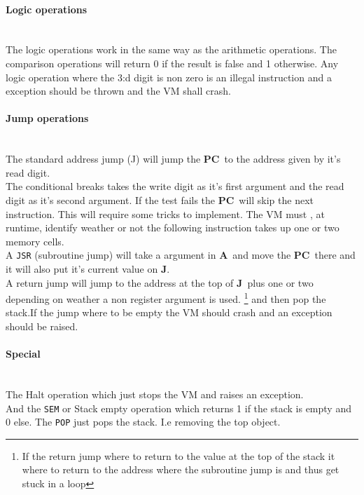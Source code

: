 \documentclass{article}
\newcommand{\V}{\verb}
\newcommand{\A}{$\textbf{A}$}
\newcommand{\pc}{$\textbf{PC}$}
\newcommand{\J}{$\textbf{J}$}
\begin{document}
\paragraph{Logic operations} \
\\
The logic operations work in the same way as the arithmetic operations. The
comparison operations will return 0 if the result is false and 1 otherwise.
Any logic operation where the 3:d digit is non zero is an illegal instruction
and a exception should be thrown and the VM shall crash.

\paragraph{Jump operations} \
\\
The standard address jump (J) will jump the \pc \ to the address given by it's
read digit.\\
The conditional breaks takes the write digit as it's first argument and the read
digit as it's second argument. If the test fails the \pc \ will skip the next
instruction. This will require some tricks to implement. The VM must , at
runtime, identify weather or not the following instruction takes up one or two
memory cells.\\

A \V+JSR+ (subroutine jump) will take a argument in \A \ and move the \pc \
there and it will also put it's current value on \J.\\
A return jump will jump to the address at the top of \J \ plus one or two
depending on weather a non register argument is used.
 \footnote{If the return jump where to return to the value at the top of the
 stack it where to return to the address where the subroutine jump is and thus
 get stuck in a loop} and then pop the stack.If the jump where to be empty the
 VM should crash and an exception should be raised.\\


\paragraph{Special}\
\\
The Halt operation which just stops the VM and
raises an exception.\\
And the \V+SEM+ or Stack empty operation which returns 1 if the stack is empty
and 0 else.
The \V+POP+ just pops the stack. I.e removing the top object.
\end{document}
